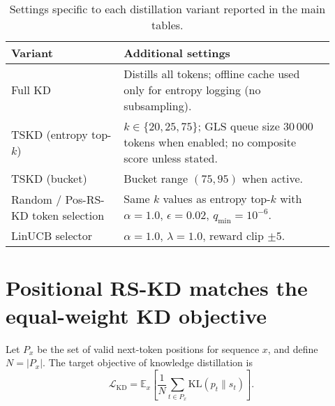 \documentclass[11pt]{article}
\begin{document}
\begin{table}[h]
	\centering
	\small
	\setlength{\tabcolsep}{8pt}
\begin{tabular}{p{0.32\linewidth}p{0.6\linewidth}}
Variant & Additional settings \\
\midrule
Full KD & Distills all tokens; offline cache used only for entropy logging (no subsampling). \\
TSKD (entropy top-$k$) & $k\in\{20,25,75\}$; GLS queue size $30\,000$ tokens when enabled; no composite score unless stated. \\
TSKD (bucket) & Bucket range $(75,95)$ when active. \\
Random / Pos-RS-KD token selection & Same $k$ values as entropy top-$k$ with $\alpha=1.0$, $\epsilon=0.02$, $q_{\min}=10^{-6}$. \\
LinUCB selector & $\alpha=1.0$, $\lambda=1.0$, reward clip $\pm 5$. \\
\bottomrule
\end{tabular}
\caption{Settings specific to each distillation variant reported in the main tables.}
\label{tab:variant-hparams}
\end{table}

\section{Positional RS-KD matches the equal-weight KD objective}
\label{app:pos-rs-kd-proof}

Let \(P_x\) be the set of valid next-token positions for sequence \(x\), and define \(N=\lvert P_x\rvert\).
The target objective of knowledge distillation is
\[
	\mathcal{L}_{\text{KD}}
	=\mathbb{E}_{x}\!\left[\frac{1}{N}\sum_{t\in P_x}\mathrm{KL}(p_t\|s_t)\right].
\]
\end{document}
